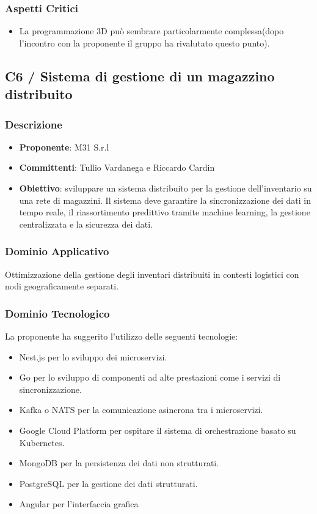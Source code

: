 \documentclass[a4paper, 12pt]{article}
\begin{document}
\subsubsection{Aspetti Critici}
\begin{itemize}
    \item La programmazione 3D può sembrare particolarmente complessa(dopo l'incontro con la proponente il gruppo ha rivalutato questo punto).
\end{itemize}


\subsection{C6 / Sistema di gestione di un magazzino distribuito}
\subsubsection{Descrizione}
\begin{itemize}
    \item \textbf{Proponente}: M31 S.r.l
    \item \textbf{Committenti}: Tullio Vardanega e Riccardo Cardin
    \item \textbf{Obiettivo}: sviluppare un sistema distribuito per la gestione dell'inventario su una rete di magazzini. Il sistema deve garantire la sincronizzazione dei dati in tempo reale, il riassortimento predittivo tramite machine learning, la gestione centralizzata e la sicurezza dei dati.
\end{itemize}

\subsubsection{Dominio Applicativo}
Ottimizzazione della gestione degli inventari distribuiti in contesti logistici con nodi geograficamente separati.

\subsubsection{Dominio Tecnologico}
La proponente ha suggerito l’utilizzo delle seguenti tecnologie:
\begin{itemize}
    \item Nest.js per lo sviluppo dei microservizi.
    \item Go per lo sviluppo di componenti ad alte prestazioni come i servizi di sincronizzazione.
    \item Kafka o NATS per la comunicazione asincrona tra i microservizi.
    \item Google Cloud Platform per ospitare il sistema di orchestrazione basato su Kubernetes.
    \item MongoDB per la persistenza dei dati non strutturati.
    \item PostgreSQL per la gestione dei dati strutturati.
    \item Angular per l’interfaccia grafica
\end{itemize}
\end{document}
